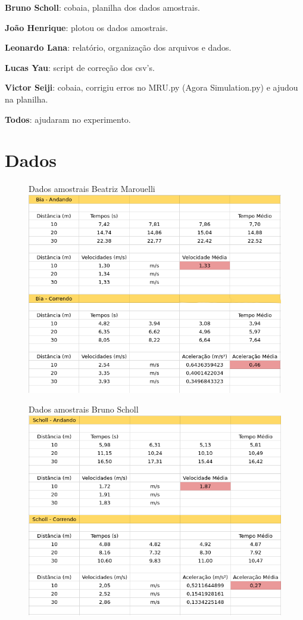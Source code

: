 \documentclass[a4paper, 12pt]{article}
\begin{document}
\textbf{Bruno Scholl}: cobaia, planilha dos dados amostrais.

\textbf{João Henrique}: plotou os dados amostrais.

\textbf{Leonardo Lana}: relatório, organização dos arquivos e dados.

\textbf{Lucas Yau}: script de correção dos csv's.

\textbf{Victor Seiji}: cobaia, corrigiu erros no MRU.py (Agora Simulation.py) e ajudou na planilha.

\textbf{Todos}: ajudaram no experimento.

\section*{Dados}
    \begin{figure}[h]
    \centering
    Dados amostrais Beatriz Marouelli
    \includegraphics[scale=0.45]{Bia.png}
    \end{figure}
    
    \begin{figure}[h]
    \centering
    Dados amostrais Bruno Scholl
    \includegraphics[scale=0.45]{Scholl.png}
    \end{figure}
    
\end{document}
